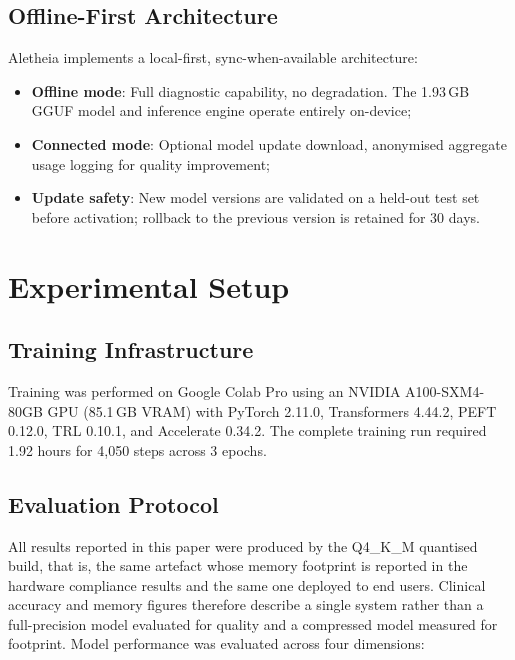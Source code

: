 \documentclass[journal]{IEEEtran}
\begin{document}
\subsection{Offline-First Architecture}

Aletheia implements a local-first, sync-when-available architecture:
\begin{itemize}
  \item \textbf{Offline mode}: Full diagnostic capability, no
        degradation. The 1.93\,GB GGUF model and inference engine
        operate entirely on-device;
  \item \textbf{Connected mode}: Optional model update download,
        anonymised aggregate usage logging for quality improvement;
  \item \textbf{Update safety}: New model versions are validated on
        a held-out test set before activation; rollback to the
        previous version is retained for 30 days.
\end{itemize}

\section{Experimental Setup}
\label{sec:experiments}

\subsection{Training Infrastructure}

Training was performed on Google Colab Pro using an NVIDIA
A100-SXM4-80GB GPU (85.1\,GB VRAM) with PyTorch 2.11.0,
Transformers 4.44.2, PEFT 0.12.0, TRL 0.10.1, and
Accelerate 0.34.2. The complete training run required 1.92 hours
for 4{,}050 steps across 3 epochs.

\subsection{Evaluation Protocol}

All results reported in this paper were produced by the Q4\_K\_M
quantised build, that is, the same artefact whose memory footprint is
reported in the hardware compliance results and the same one deployed
to end users. Clinical accuracy and memory figures therefore describe a
single system rather than a full-precision model evaluated for quality
and a compressed model measured for footprint. Model performance was
evaluated across four dimensions:
\end{document}
